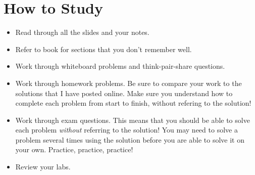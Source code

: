 
\vspace*{-.15in}
\section{How to Study}
\vspace*{-.15in}
\begin{itemize}
\item Read through all the slides and your notes.
\item Refer to book for sections that you don't remember well.
\item Work through whiteboard problems and think-pair-share questions.
\item Work through homework problems.  Be sure to compare your
  work to the solutions that I have posted online.  Make sure you
  understand how to complete each problem from start to finish,
  without refering to the solution!
\item Work through exam questions.  This means that you should be able
  to solve each problem {\em without} referring to the solution!  You
  may need to solve a problem several times using the solution before
  you are able to solve it on your own.  Practice, practice, practice!
\item Review your labs.
\end{itemize}



